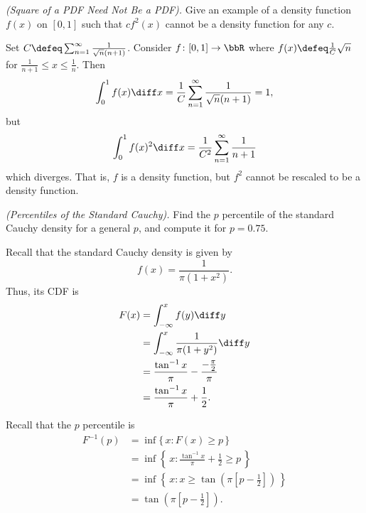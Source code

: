 \newpage

\begin{problem}[Handout 12, \# 20]
  \emph{(Square of a PDF Need Not Be a PDF).} Give an example of a density
  function \(f(x)\) on \([0,1]\) such that \(cf^2(x)\) cannot be a density
  function for any \(c\).
\end{problem}
\begin{solution}
  Set $C \defeq\sum_{n=1}^\infty \frac{1}{\sqrt{n}(n+1)}$. Consider
  $f\colon [0,1] \to \bbR$ where $f(x)\defeq\frac{1}{C}\sqrt{n}$ for
  $\frac{1}{n+1}\leq x\leq \frac{1}{n}$. Then
  \[
    \int_0^1 f(x) \diff x = \frac{1}{C} \sum_{n=1}^\infty
    \frac{1}{\sqrt{n}(n+1)} =1,
  \]
  but
  \[
    \int_0^1 f(x)^2 \diff x = \frac{1}{C^2} \sum_{n=1}^\infty \frac{1}{n+1}
  \]
  which diverges. That is, $f$ is a density function, but $f^2$ cannot be
  rescaled to be a density function.
\end{solution}
\newpage

\begin{problem}[Handout 12, \# 21]
  \emph{(Percentiles of the Standard Cauchy).} Find the \(p\)
  percentile of the standard Cauchy density for a general \(p\), and
  compute it for \(p=0.75\).
\end{problem}
\begin{solution}
  Recall that the standard Cauchy density is given by
  \[
    f(x)=\frac{1}{\pi(1+x^2)}.
  \]
  Thus, its CDF is
  \begin{align*}
    F(x)
    &=\int_{-\infty}^xf(y)\diff y\\
    &=\int_{-\infty}^x\frac{1}{\pi(1+y^2)}\diff y\\
    &=\frac{\tan^{-1}x}{\pi}-\frac{-\frac{\pi}{2}}{\pi}\\
    &=\frac{\tan^{-1}x}{\pi}+\frac{1}{2}.
  \end{align*}

  Recall that the \(p\) percentile is
  \begin{align*}
    F^{-1}(p)
    &=\inf\{\,x: F(x)\geq p\,\}\\
    &=\inf\left\{\,x:\frac{\tan^{-1}x}{\pi}+\frac{1}{2}\geq p\,\right\}\\
    &=\inf\left\{\,x:x\geq \tan\left(\pi\left[p-\frac{1}{2}\right]\right)\,\right\}\\
    &=\tan\left(\pi\left[p-\frac{1}{2}\right]\right).
  \end{align*}
\end{solution}
\newpage

